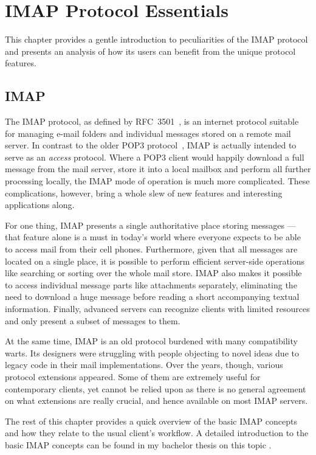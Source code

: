 \documentclass[trojita]{subfiles}
\begin{document}
\chapter{IMAP Protocol Essentials}
\label{sec:imap-protocol}

This chapter provides a gentle introduction to peculiarities of the IMAP protocol and presents an analysis of how its
users can benefit from the unique protocol features.

\section{IMAP}

The IMAP protocol, as defined by RFC~3501~\cite{rfc3501}, is an internet protocol suitable for managing e-mail folders
and individual messages stored on a remote mail server.  In contrast to the older POP3 protocol~\cite{rfc1939}, IMAP is
actually intended to serve as an {\em access} protocol.  Where a POP3 client would happily download a full message from
the mail server, store it into a local mailbox and perform all further processing locally, the IMAP mode of operation is
much more complicated.  These complications, however, bring a whole slew of new features and interesting applications
along.

For one thing, IMAP presents a single authoritative place storing messages --- that feature alone is a must in today's world
where everyone expects to be able to access mail from their cell phones.  Furthermore, given that all messages
are located on a single place, it is possible to perform efficient server-side operations like searching or sorting over
the whole mail store.  IMAP also makes it possible to access individual message parts like attachments separately,
eliminating the need to download a huge message before reading a short accompanying textual information.  Finally,
advanced servers can recognize clients with limited resources and only present a subset of messages to them.

At the same time, IMAP is an old protocol burdened with many compatibility warts.  Its designers were struggling with
people objecting to novel ideas due to legacy code in their mail implementations.  Over the years, though, various
protocol extensions appeared.  Some of them are extremely useful for contemporary clients, yet cannot be relied upon
as there is no general agreement on what extensions are really crucial, and hence available on most IMAP servers.

The rest of this chapter provides a quick overview of the basic IMAP concepts and how they relate to the usual client's
workflow.  A detailed introduction to the basic IMAP concepts can be found in my bachelor thesis on this topic
\cite[p. 9 - 19]{jkt-bc-thesis}.
\end{document}
